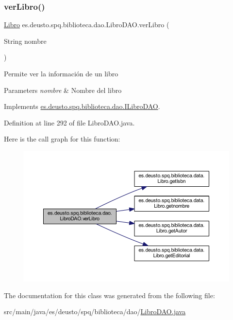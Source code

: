 \subsubsection{\texorpdfstring{ver\+Libro()}{verLibro()}}
{\footnotesize\ttfamily \mbox{\hyperlink{classes_1_1deusto_1_1spq_1_1biblioteca_1_1data_1_1_libro}{Libro}} es.\+deusto.\+spq.\+biblioteca.\+dao.\+Libro\+D\+A\+O.\+ver\+Libro (\begin{DoxyParamCaption}\item[{String}]{nombre }\end{DoxyParamCaption})}

Permite ver la información de un libro 
\begin{DoxyParams}{Parameters}
{\em nombre} & Nombre del libro \\
\hline
\end{DoxyParams}


Implements \mbox{\hyperlink{interfacees_1_1deusto_1_1spq_1_1biblioteca_1_1dao_1_1_i_libro_d_a_o_ae390d687e8e4ec02a401291da5076062}{es.\+deusto.\+spq.\+biblioteca.\+dao.\+I\+Libro\+D\+AO}}.



Definition at line 292 of file Libro\+D\+A\+O.\+java.

Here is the call graph for this function\+:
\nopagebreak
\begin{figure}[H]
\begin{center}
\leavevmode
\includegraphics[width=350pt]{classes_1_1deusto_1_1spq_1_1biblioteca_1_1dao_1_1_libro_d_a_o_a8138eaa485efda1fa97a158f460301dd_cgraph}
\end{center}
\end{figure}


The documentation for this class was generated from the following file\+:\begin{DoxyCompactItemize}
\item 
src/main/java/es/deusto/spq/biblioteca/dao/\mbox{\hyperlink{_libro_d_a_o_8java}{Libro\+D\+A\+O.\+java}}\end{DoxyCompactItemize}
